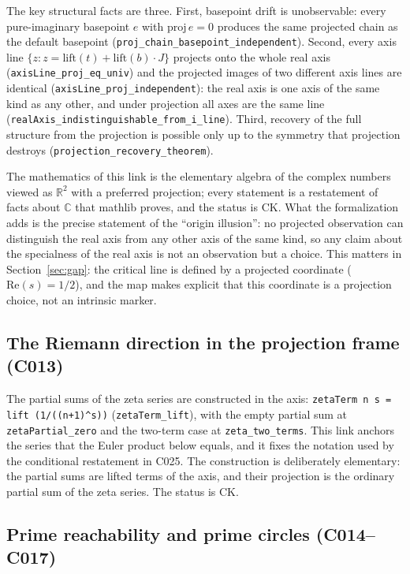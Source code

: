\documentclass[sigplan,10pt,anonymous,review]{acmart}
\begin{document}
The key structural facts are three. First, basepoint drift is
unobservable: every pure-imaginary basepoint $e$ with
$\mathrm{proj}\, e = 0$ produces the same projected chain as the default
basepoint (\texttt{proj\_chain\_basepoint\_independent}). Second, every
axis line $\{z : z = \mathrm{lift}(t) + \mathrm{lift}(b) \cdot J\}$
projects onto the whole real axis (\texttt{axisLine\_proj\_eq\_univ}) and
the projected images of two different axis lines are identical
(\texttt{axisLine\_proj\_independent}): the real axis is one axis of the
same kind as any other, and under projection all axes are the same line
(\texttt{realAxis\_indistinguishable\_from\_i\_line}). Third, recovery of
the full structure from the projection is possible only up to the
symmetry that projection destroys
(\texttt{projection\_recovery\_theorem}).

The mathematics of this link is the elementary algebra of the complex
numbers viewed as $\mathbb{R}^2$ with a preferred projection; every
statement is a restatement of facts about $\mathbb{C}$ that mathlib
proves, and the status is \textcolor{classical}{CK}. What the
formalization adds is the precise statement of the ``origin illusion'':
no projected observation can distinguish the real axis from any other
axis of the same kind, so any claim about the specialness of the real
axis is not an observation but a choice. This matters in
Section~\ref{sec:gap}: the critical line is defined by a projected
coordinate ($\mathrm{Re}(s) = 1/2$), and the map makes explicit that this
coordinate is a projection choice, not an intrinsic marker.

\subsection{The Riemann direction in the projection frame (C013)}

The partial sums of the zeta series are constructed in the axis:
\texttt{zetaTerm n s = lift (1/((n+1)\^{}s))}
(\texttt{zetaTerm\_lift}), with the empty partial sum at
\texttt{zetaPartial\_zero} and the two-term case at
\texttt{zeta\_two\_terms}. This link anchors the series that the Euler
product below equals, and it fixes the notation used by the conditional
restatement in C025. The construction is deliberately elementary: the
partial sums are lifted terms of the axis, and their projection is the
ordinary partial sum of the zeta series. The status is
\textcolor{classical}{CK}.

\subsection{Prime reachability and prime circles (C014--C017)}
\end{document}
